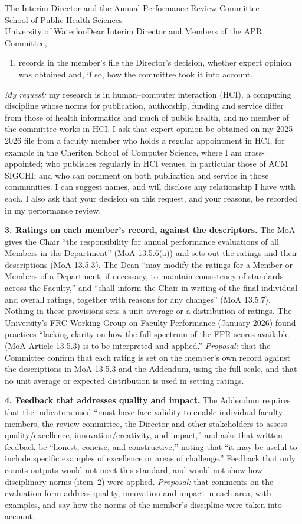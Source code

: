 \begin{aprletter}{%
The Interim Director and the Annual Performance Review Committee\\
School of Public Health Sciences\\
University of Waterloo}{Dear Interim Director and Members of the APR Committee,}
\begin{enumerate}[leftmargin=1.75em, itemsep=2pt, topsep=4pt, parsep=0pt, label=(\alph*)]
    \item records in the member's file the Director's decision, whether expert opinion was obtained and, if so, how the committee took it into account.
\end{enumerate}
\emph{My request:} my research is in human--computer interaction (HCI), a computing discipline whose norms for publication, authorship, funding and service differ from those of health informatics and much of public health, and no member of the committee works in HCI. I ask that expert opinion be obtained on my 2025--2026 file from a faculty member who holds a regular appointment in HCI, for example in the Cheriton School of Computer Science, where I am cross-appointed; who publishes regularly in HCI venues, in particular those of ACM SIGCHI; and who can comment on both publication and service in those communities. I can suggest names, and will disclose any relationship I have with each. I also ask that your decision on this request, and your reasons, be recorded in my performance review.

\textbf{3. Ratings on each member's record, against the descriptors.} The MoA gives the Chair ``the responsibility for annual performance evaluations of all Members in the Department'' (MoA 13.5.6(a)) and sets out the ratings and their descriptions (MoA 13.5.3). The Dean ``may modify the ratings for a Member or Members of a Department, if necessary, to maintain consistency of standards across the Faculty,'' and ``shall inform the Chair in writing of the final individual and overall ratings, together with reasons for any changes'' (MoA 13.5.7). Nothing in these provisions sets a unit average or a distribution of ratings. The University's FRC Working Group on Faculty Performance (January 2026) found practices ``lacking clarity on how the full spectrum of the FPR scores available (MoA Article 13.5.3) is to be interpreted and applied.'' \emph{Proposal:} that the Committee confirm that each rating is set on the member's own record against the descriptions in MoA 13.5.3 and the Addendum, using the full scale, and that no unit average or expected distribution is used in setting ratings.

\textbf{4. Feedback that addresses quality and impact.} The Addendum requires that the indicators used ``must have face validity to enable individual faculty members, the review committee, the Director and other stakeholders to assess quality/excellence, innovation/creativity, and impact,'' and asks that written feedback be ``honest, concise, and constructive,'' noting that ``it may be useful to include specific examples of excellence or areas of challenge.'' Feedback that only counts outputs would not meet this standard, and would not show how disciplinary norms (item~2) were applied. \emph{Proposal:} that comments on the evaluation form address quality, innovation and impact in each area, with examples, and say how the norms of the member's discipline were taken into account.


\end{aprletter}

